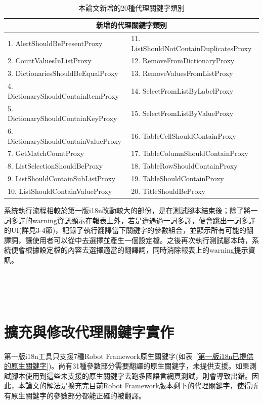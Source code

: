 \hspace*{\fill} \\

\begin{table}[H]
    \centering
        \begin{tabular}{|l|l|}
        \hline
        \multicolumn{2}{|c|}{新增的代理關鍵字類别} \\ \hline
        1. AlertShouldBePresentProxy & 11. ListShouldNotContainDuplicatesProxy\\ 
        2. CountValuesInListProxy & 12. RemoveFromDictionaryProxy\\ 
        3. DictionariesShouldBeEqualProxy & 13. RemoveValuesFromListProxy\\
        4. DictionaryShouldContainItemProxy & 14. SelectFromListByLabelProxy\\
        5. DictionaryShouldContainKeyProxy & 15. SelectFromListByValueProxy\\
        6. DictionaryShouldContainValueProxy & 16. TableCellShouldContainProxy\\
        7. GetMatchCountProxy & 17. TableColumnShouldContainProxy\\
        8. ListSelectionShouldBeProxy & 18. TableRowShouldContainProxy\\
        9. ListShouldContainSubListProxy & 19. TableShouldContainProxy\\
        10. ListShouldContainValueProxy & 20. TitleShouldBeProxy\\   
        \hline
        \end{tabular}
    \caption{本論文新增的20種代理關鍵字類別}
    \label{本論文新增的20種代理關鍵字類別}
\end{table}

系統執行流程相較於第一版i18n改動較大的部份，是在測試腳本結束後；除了將一詞多譯的warning資訊顯示在報表上外，若是遭遇過一詞多譯，便會跳出一詞多譯的UI(詳見3-4節)，記錄了執行翻譯當下關鍵字的參數組合，並顯示所有可能的翻譯詞，讓使用者可以從中去選擇並產生一個設定檔。之後再次執行測試腳本時，系統便會根據設定檔的內容去選擇適當的翻譯詞，同時消除報表上的warning提示資訊。

\hspace*{\fill} \\
\\ \hspace*{\fill} \\

\section{擴充與修改代理關鍵字實作}
第一版i18n工具只支援7種Robot Framework原生關鍵字(如表~\ref{第一版i18n已提供的原生關鍵字})\cite{i18n}。尚有31種參數部分需要翻譯的原生關鍵字，未提供支援。如果測試腳本使用到這些未支援的原生關鍵字去跑多國語言網頁測試，則會導致出錯。因此，本論文的解法是擴充完目前Robot Framework版本剩下的代理關鍵字，使得所有原生關鍵字的參數部分都能正確的被翻譯。

